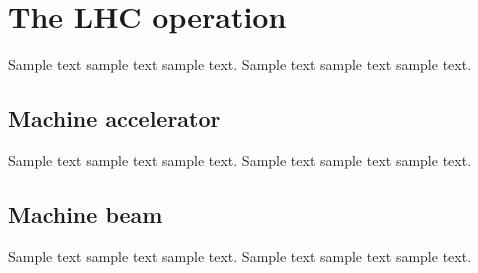 \section{The LHC operation}
\label{sec:lhcs3}
\par Sample text sample text sample text. Sample text sample text sample text.

\subsection{Machine accelerator}
\par Sample text sample text sample text. Sample text sample text sample text.

\subsection{Machine beam}
\par Sample text sample text sample text. Sample text sample text sample text.
